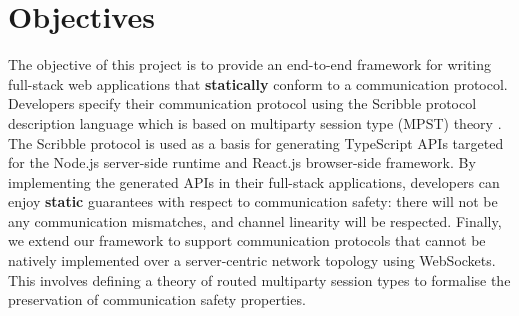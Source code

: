 \section{Objectives}

The objective of this project is to provide an end-to-end
framework for writing full-stack web applications that
\textbf{statically} conform to a communication protocol.
Developers specify their communication protocol using
the Scribble protocol description language \cite{Scribble}
which is based on multiparty session type (MPST) theory \cite{MPST}.
The Scribble protocol is used as a basis for generating
TypeScript APIs targeted for the Node.js server-side runtime
and React.js browser-side framework. 
By implementing the generated APIs in their full-stack applications,
developers can enjoy \textbf{static} guarantees with respect 
to communication safety: there will not be any communication mismatches,
and channel linearity will be respected.
Finally, we extend our framework to support communication
protocols that cannot be natively implemented over
a server-centric network topology using WebSockets.
This involves defining a theory of routed multiparty session types
to formalise the preservation of communication safety properties.